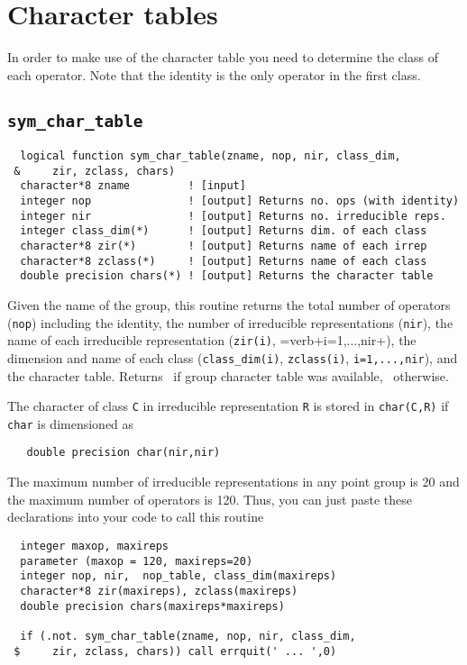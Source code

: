 \section{Character tables}

In order to make use of the character table you need to determine the
class of each operator.  Note that the identity is the only operator
in the first class.

\subsection{{\tt sym\_char\_table}}
\begin{verbatim}
  logical function sym_char_table(zname, nop, nir, class_dim,
 &     zir, zclass, chars)
  character*8 zname         ! [input]
  integer nop               ! [output] Returns no. ops (with identity)
  integer nir               ! [output] Returns no. irreducible reps.
  integer class_dim(*)      ! [output] Returns dim. of each class
  character*8 zir(*)        ! [output] Returns name of each irrep
  character*8 zclass(*)     ! [output] Returns name of each class
  double precision chars(*) ! [output] Returns the character table
\end{verbatim}
Given the name of the group, this routine returns the
total number of operators (\verb+nop+) including the identity, the
number of irreducible representations (\verb+nir+), the name of each
irreducible representation (\verb+zir(i)+, =verb+i=1,...,nir+), the
dimension and name of each class (\verb+class_dim(i)+,
\verb+zclass(i)+, \verb+i=1,...,nir+), and the character table.  
Returns \TRUE\ if group character table was available, \FALSE\ 
otherwise.

The character of class \verb+C+ in irreducible representation \verb+R+
is stored in \verb+char(C,R)+ if \verb+char+ is dimensioned as
\begin{verbatim}
   double precision char(nir,nir)
\end{verbatim}
The maximum number of irreducible representations in any point group
is 20 and the maximum number of operators is 120.  Thus, you can just
paste these declarations into your code to call this routine
\begin{verbatim}
  integer maxop, maxireps     
  parameter (maxop = 120, maxireps=20)
  integer nop, nir,  nop_table, class_dim(maxireps)
  character*8 zir(maxireps), zclass(maxireps)
  double precision chars(maxireps*maxireps)

  if (.not. sym_char_table(zname, nop, nir, class_dim,
 $     zir, zclass, chars)) call errquit(' ... ',0)
\end{verbatim}

